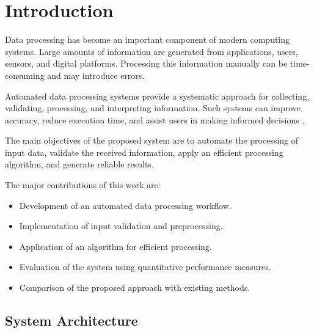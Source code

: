 \documentclass[conference]{IEEEtran}
\begin{document}

\section{Introduction}

Data processing has become an important component of modern
computing systems. Large amounts of information are generated
from applications, users, sensors, and digital platforms.
Processing this information manually can be time-consuming
and may introduce errors.

Automated data processing systems provide a systematic
approach for collecting, validating, processing, and
interpreting information. Such systems can improve accuracy,
reduce execution time, and assist users in making informed
decisions \cite{russell2010,mitchell1997}.

The main objectives of the proposed system are to automate
the processing of input data, validate the received
information, apply an efficient processing algorithm, and
generate reliable results.

The major contributions of this work are:

\begin{itemize}

\item Development of an automated data processing workflow.

\item Implementation of input validation and preprocessing.

\item Application of an algorithm for efficient processing.

\item Evaluation of the system using quantitative
performance measures.

\item Comparison of the proposed approach with existing
methods.

\end{itemize}


\subsection{System Architecture}
\end{document}
